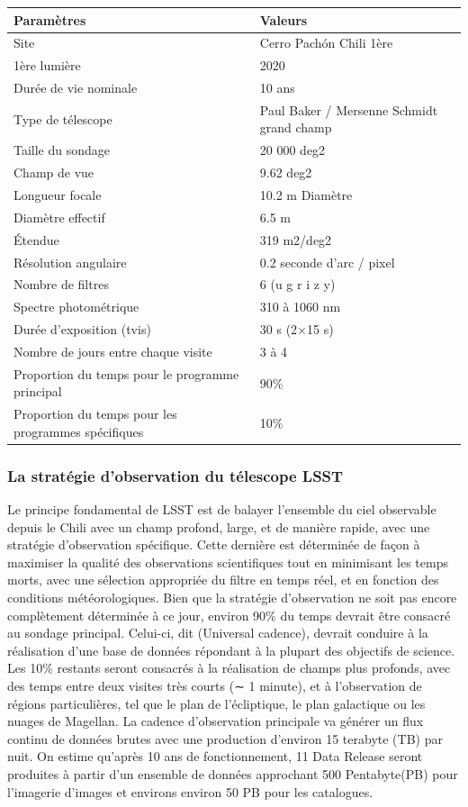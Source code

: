 \begin{tabular}{|p{10cm}|p{6cm}|}
\hline 
Paramètres & Valeurs \\
\hline 
 Site & Cerro Pachón Chili 1ère \\
\hline 
 1ère lumière & 2020 \\
\hline 
 Durée de vie nominale & 10 ans\\
\hline 
 Type de télescope & Paul Baker / Mersenne Schmidt grand champ \\
\hline 
Taille du sondage & 20 000 deg2 \\
\hline 
Champ de vue & 9.62 deg2 \\
\hline 
Longueur focale & 10.2 m Diamètre \\
\hline 
Diamètre effectif & 6.5 m \\
\hline 
Étendue & 319 m2/deg2 \\
\hline 
Résolution angulaire & 0.2 seconde d'arc / pixel\\
\hline 
Nombre de filtres & 6 (u g r i z y) \\
\hline 
Spectre photométrique & 310 à 1060 nm \\
\hline 
Durée d'exposition (tvis) & 30 s (2×15 s) \\
\hline 
Nombre de jours entre chaque visite & 3 à 4 \\
\hline 
Proportion du temps pour le programme principal & 90\% \\
\hline 
Proportion du temps pour les programmes spécifiques & 10\% \\
\hline
\end{tabular}
\subsubsection{La stratégie d'observation du télescope LSST}
Le principe fondamental de LSST est de balayer l'ensemble du ciel observable depuis le Chili avec un champ profond, large, et de manière rapide, avec une stratégie d'observation spécifique. Cette dernière est déterminée de façon à maximiser la qualité des observations scientifiques tout en minimisant les temps morts, avec une sélection appropriée du filtre en temps réel, et en fonction des conditions météorologiques. Bien que la stratégie d'observation ne soit pas encore complètement déterminée à ce jour, environ 90\% du temps devrait être consacré au sondage principal. Celui-ci, dit (Universal cadence), devrait conduire à la réalisation d’une base de données répondant à la plupart des objectifs de science.  Les 10\% restants seront consacrés à la réalisation de champs plus profonds, avec des temps entre deux visites très courts (∼ 1 minute), et à l'observation de régions particulières, tel que le plan de l'écliptique, le plan galactique ou les nuages de Magellan.
La cadence d'observation principale va générer un flux continu de données brutes avec une production d'environ 15 terabyte (TB) par nuit. On estime qu'après 10 ans de fonctionnement, 11 Data Release seront produites à partir d'un ensemble de données approchant 500 Pentabyte(PB) pour l'imagerie d'images et environs environ 50 PB pour les catalogues.
